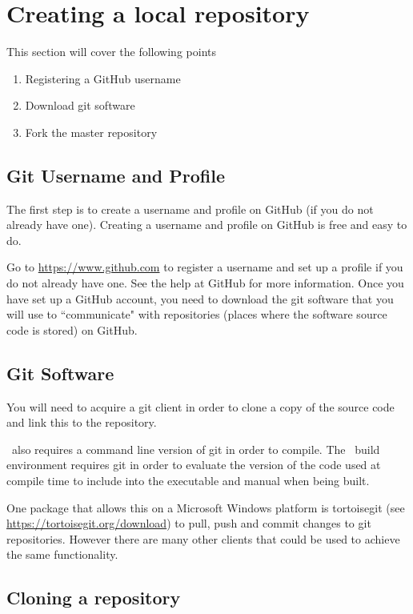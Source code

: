 \section{Creating a local repository\label{sec:local_repo}}

This section will cover the following points

\begin{enumerate}
	\item Registering a GitHub username
	\item Download git software
	\item Fork the master repository
\end{enumerate}

\subsection{Git Username and Profile}

The first step is to create a username and profile on GitHub (if you do not already have one). Creating a username and profile on GitHub is free and easy to do. 

Go to \url{https://www.github.com} to register a username and set up a profile if you do not already have one. See the help at GitHub for more information. Once you have set up a GitHub account, you need to download the git software that you will use to ``communicate" with repositories (places where the software source code is stored) on GitHub.

\subsection{Git Software}

You will need to acquire a git client in order to clone a copy of the source code and link this to the repository.

\CNAME\ also requires a command line version of git in order to compile. The \CNAME\ build environment requires git in order to evaluate the version of the code used at compile time to include into the executable and manual when being built. 

One package that allows this on a Microsoft Windows platform is tortoisegit (see \url{https://tortoisegit.org/download}) to pull, push and commit changes to git repositories. However there are many other clients that could be used to achieve the same functionality.

\subsection{Cloning a repository}

